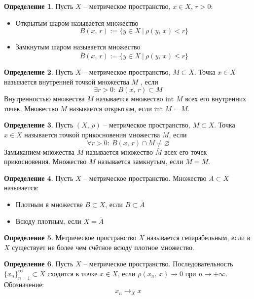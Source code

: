 \documentclass[a4paper,12pt]{article}
\renewcommand{\leq}{\ensuremath{\leqslant}}
\renewcommand{\emptyset}{\ensuremath{\varnothing}}
\theoremstyle{plain}
\theoremstyle{definition}
\newtheorem{definition}{Определение}[section]
\theoremstyle{remark}
\begin{document}
\begin{definition}
	Пусть $X$ -- метрическое пространство, $x \in X,\, r > 0$:
	\begin{itemize}
		\item Открытым шаром называется множество
		      \[
			      B(x,\, r) := \{y \in X \:\vert\: \rho(y,\,x) < r\}
		      \]
		\item Замкнутым шаром называется множество
		      \[
			      \overline{B}(x,\,r) := \{y \in X \:\vert\: \rho(y,\,x) \leq r\}
		      \]
	\end{itemize}
\end{definition}

\begin{definition}
	Пусть $X$ -- метрическое пространство, $M \subset X$. Точка $x \in X$ называется внутренней точкой множества $M$ , если
	\[
		\exists r > 0 :\: B(x,\, r) \subset M
	\]
	Внутренностью множества $M$ называется множество $\text{int }M$ всех его внутренних точек. Множество $M$ называется открытым, если $\text{int }M = M$.
\end{definition}

\begin{definition}
	Пусть $(X,\, \rho)$ -- метрическое пространство, $M \subset X$. Точка $x \in X$ называется точкой прикосновения множества $M$, если
	\[
		\forall r > 0 :\: B(x,\, r) \cap M \neq \emptyset
	\]
	Замыканием множества $M$ называется множество $\overline{M}$ всех его точек прикосновения. Множество $M$ называется замкнутым, если $\overline{M} = M$.
\end{definition}

\begin{definition}
	Пусть $X$ -- метрическое пространство. Множество $A \subset X$ называется:
	\begin{itemize}
		\item Плотным в множестве $B \subset X$, если $B \subset \overline{A}$
		\item Всюду плотным, если $X = \overline{A}$
	\end{itemize}
\end{definition}

\begin{definition}
	Метрическое пространство $X$ называется сепарабельным, если в $X$ существует не более чем счётное всюду плотное множество.
\end{definition}

\begin{definition}
	Пусть $X$ -- метрическое пространство. Последовательность $\{x_n\}_{n = 1}^\infty \subset X$ сходится к точке $x \in X$, если $\rho(x_n,\, x) \to 0$ при $n \to +\infty$. Обозначение:
	\[
		x_n \to_X x
	\]
\end{definition}
\end{document}
